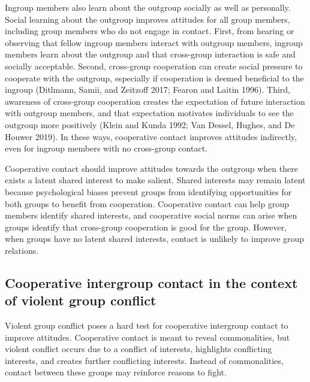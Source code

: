 \documentclass[11pt]{article}
\begin{document}
Ingroup members also learn about the outgroup socially as well as
personally. Social learning about the outgroup improves attitudes for
all group members, including group members who do not engage in contact.
First, from hearing or observing that fellow ingroup members interact
with outgroup members, ingroup members learn about the outgroup and that
cross-group interaction is safe and socially acceptable. Second,
cross-group cooperation can create social pressure to cooperate with the
outgroup, especially if cooperation is deemed beneficial to the ingroup
(Ditlmann, Samii, and Zeitzoff 2017; Fearon and Laitin 1996). Third,
awareness of cross-group cooperation creates the expectation of future
interaction with outgroup members, and that expectation motivates
individuals to see the outgroup more positively (Klein and Kunda 1992;
Van Dessel, Hughes, and De Houwer 2019). In these ways, cooperative
contact improves attitudes indirectly, even for ingroup members with no
cross-group contact.

Cooperative contact should improve attitudes towards the outgroup when
there exists a latent shared interest to make salient. Shared interests
may remain latent because psychological biases prevent groups from
identifying opportunities for both groups to benefit from cooperation.
Cooperative contact can help group members identify shared interests,
and cooperative social norms can arise when groups identify that
cross-group cooperation is good for the group. However, when groups have
no latent shared interests, contact is unlikely to improve group
relations.

\hypertarget{cooperative-intergroup-contact-in-the-context-of-violent-group-conflict}{%
\subsection{Cooperative intergroup contact in the context of violent
group
conflict}\label{cooperative-intergroup-contact-in-the-context-of-violent-group-conflict}}

Violent group conflict poses a hard test for cooperative intergroup
contact to improve attitudes. Cooperative contact is meant to reveal
commonalities, but violent conflict occurs due to a conflict of
interests, highlights conflicting interests, and creates further
conflicting interests. Instead of commonalities, contact between these
groups may reinforce reasons to fight.
\end{document}
